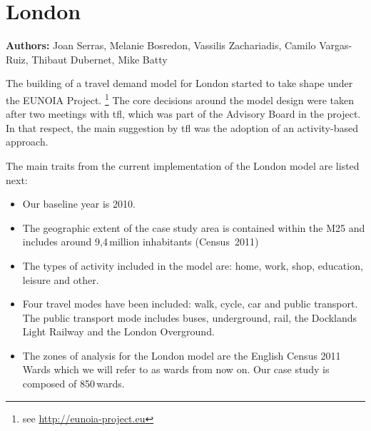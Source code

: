 \chapter{London}
\label{ch:london}
\hfill \textbf{Authors:} Joan Serras, Melanie Bosredon, Vassilis Zachariadis, Camilo Vargas-Ruiz, Thibaut Dubernet, Mike Batty


The building of a travel demand model for London started to take shape under the EUNOIA Project.%
%
\footnote{see \url{http://eunoia-project.eu}} 
The core decisions around the model design were taken after two meetings with \gls{tfl}, which was part of the Advisory Board in the project. In that respect, the main suggestion by \gls{tfl} was the adoption of an activity-based approach.

The main traits from the current implementation of the London model are listed next:

\begin{itemize}\styleItemize
\item	Our baseline year is 2010.
\item	The geographic extent of the case study area is contained within the M25 and includes around 9,4\,million inhabitants (Census~2011)
\item	The types of activity included in the model are: home, work, shop, education, leisure and other.
\item	Four travel modes have been included: walk, cycle, car and public transport. The public transport mode includes buses, underground, rail, the Docklands Light Railway and the London Overground.
\item	The zones of analysis for the London model are the English Census 2011 Wards which we will refer to as wards from now on. Our case study is composed of 850\,wards.
\end{itemize}

%
